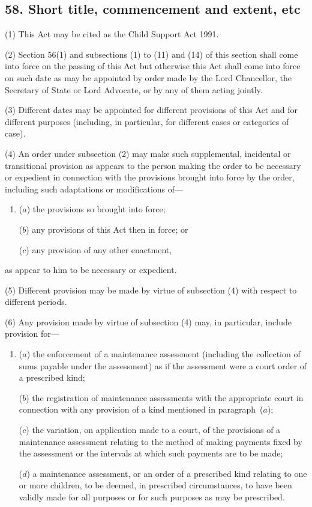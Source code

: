 \documentclass[12pt,a4paper]{article}
\begin{document}

\subsection{58. Short title, commencement and extent, etc}

(1) This Act may be cited as the Child Support Act 1991.

(2) Section 56(1)  and subsections (1)  to (11)  and (14)  of this section shall come into force on the passing of this Act but otherwise this Act shall come into force on such date as may be appointed by order made by the Lord Chancellor, the Secretary of State or Lord Advocate, or by any of them acting jointly.

(3) Different dates may be appointed for different provisions of this Act and for different purposes (including, in particular, for different cases or categories of case).

(4) An order under subsection (2)  may make such supplemental, incidental or transitional provision as appears to the person making the order to be necessary or expedient in connection with the provisions brought into force by the order, including such adaptations or modifications of—
\begin{enumerate}\item[]
($a$) the provisions so brought into force;

($b$) any provisions of this Act then in force; or

($c$) any provision of any other enactment,
\end{enumerate}
as appear to him to be necessary or expedient.

(5) Different provision may be made by virtue of subsection (4)  with respect to different periods.

(6) Any provision made by virtue of subsection (4)  may, in particular, include provision for—
\begin{enumerate}\item[]
($a$) the enforcement of a maintenance assessment (including the collection of sums payable under the assessment) as if the assessment were a court order of a prescribed kind;

($b$) the registration of maintenance assessments with the appropriate court in connection with any provision of a kind mentioned in paragraph~($a$);

($c$) the variation, on application made to a court, of the provisions of a maintenance assessment relating to the method of making payments fixed by the assessment or the intervals at which such payments are to be made;

($d$) a maintenance assessment, or an order of a prescribed kind relating to one or more children, to be deemed, in prescribed circumstances, to have been validly made for all purposes or for such purposes as may be prescribed.
\end{enumerate}
\end{document}
